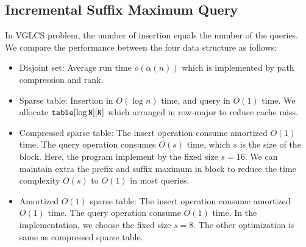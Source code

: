 

\subsection{Incremental Suffix Maximum Query}

In VGLCS problem, the number of insertion equals the number of the
queries. We compare the performance between the four data structure as
follows:

\iffalse
針對插入和詢問次數相同的 ISMQ 問題，運行以下四種數據結構：
\fi

\begin{itemize}
  \item 

Disjoint set: Average run time $o(\alpha(n))$ which is implemented by
path compression and rank.

  \item 

Sparse table: Insertion in $O(\log n)$ time, and query in $O(1)$ time.
We allocate $\tt{table}[\log N][N]$ which arranged in row-major to
reduce cache miss.



  \item 

Compressed sparse table: The insert operation consume amortized
$O(1)$ time.  The query operation consumes $O(s)$ time, which $s$ is the
size of the block.  Here, the program implement by the fixed size $s =
16$.  We can maintain extra the prefix and suffix maximum in block to
reduce the time complexity $O(s)$ to $O(1)$ in most queries.

  \item

Amortized $O(1)$ sparse table:  The insert operation consume amortized
$O(1)$ time.  The query operation consume $O(1)$ time.  In the
implementation, we choose the fixed size $s = 8$.  The other
optimization is same as compressed sparse table.

\end{itemize}

\iffalse
\begin{itemize}
  \item 并查集 (Disjoint Set): 平均運行時間 $o(\alpha(n))$。只使用路徑壓縮技巧。
  \item 稀疏表 (Sparse Table): 插入 $O(\log n)$、詢問 $O(1)$。實作陣列宣告採用 $\tt{table}[\log N][N]$ 以減少快取未中。
  \item 樹狀數組 (Binary Indexed Tree): 插入、詢問均為 $O(\log n)$。
  \item 壓縮稀疏表 (Compressed Sparse Tree): 插入均攤 $O(1)$、詢問操作 $O(s)$，
  其中 $s$ 為拆分到區塊大小。實作時，維護區塊前綴和後綴最大值降低詢問複雜度至 $O(1)$，當發生 in-block 詢問再運行 $O(s)$ 算法。
\end{itemize}
\fi

